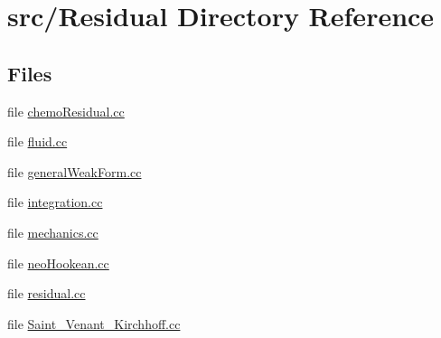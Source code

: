 \section{src/\-Residual Directory Reference}
\label{dir_a54b846a38667bebabe1a8bbbe4a4eee}
\subsection*{Files}
\begin{DoxyCompactItemize}
\item 
file \hyperlink{chemo_residual_8cc}{chemo\-Residual.\-cc}
\item 
file \hyperlink{fluid_8cc}{fluid.\-cc}
\item 
file \hyperlink{general_weak_form_8cc}{general\-Weak\-Form.\-cc}
\item 
file \hyperlink{integration_8cc}{integration.\-cc}
\item 
file \hyperlink{mechanics_8cc}{mechanics.\-cc}
\item 
file \hyperlink{neo_hookean_8cc}{neo\-Hookean.\-cc}
\item 
file \hyperlink{residual_8cc}{residual.\-cc}
\item 
file \hyperlink{_saint___venant___kirchhoff_8cc}{Saint\-\_\-\-Venant\-\_\-\-Kirchhoff.\-cc}
\end{DoxyCompactItemize}
